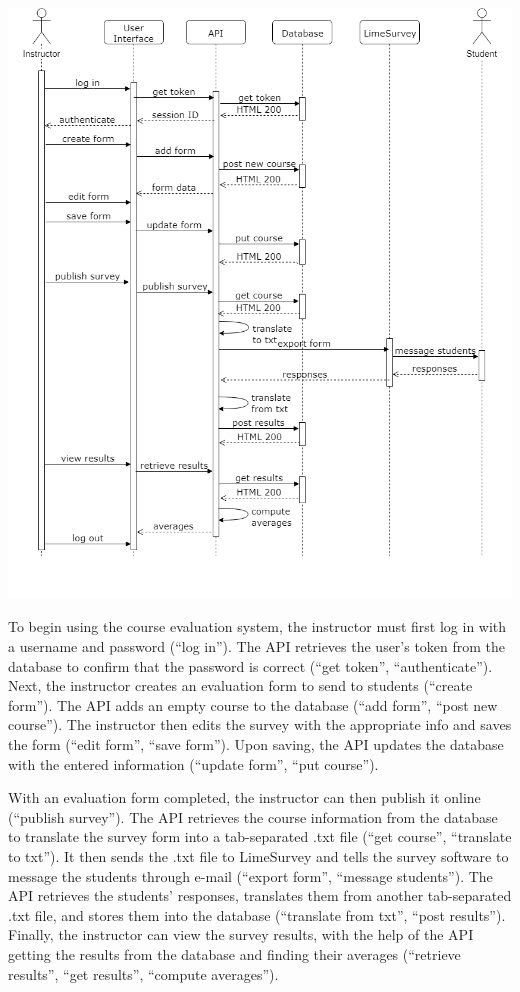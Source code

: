 \documentclass{article}
\begin{document}
\begin{center}
\label{fig:sequencediagram}
{\includegraphics[scale=.6]{images/sequence_diagram.png}}
\end{center}

\newpage

To begin using the course evaluation system, the instructor must first log in with a username and password (``log in''). The API retrieves the user's token from the database to confirm that the password is correct (``get token'', ``authenticate''). Next, the instructor creates an evaluation form to send to students (``create form''). The API adds an empty course to the database (``add form'', ``post new course''). The instructor then edits the survey with the appropriate info and saves the form (``edit form'', ``save form''). Upon saving, the API updates the database with the entered information (``update form'', ``put course'').

With an evaluation form completed, the instructor can then publish it online (``publish survey''). The API retrieves the course information from the database to translate the survey form into a tab-separated .txt file (``get course'', ``translate to txt''). It then sends the .txt file to LimeSurvey and tells the survey software to message the students through e-mail (``export form'', ``message students''). The API retrieves the students' responses, translates them from another tab-separated .txt file, and stores them into the database (``translate from txt'', ``post results''). Finally, the instructor can view the survey results, with the help of the API getting the results from the database and finding their averages (``retrieve results'', ``get results'', ``compute averages'').
\end{document}
